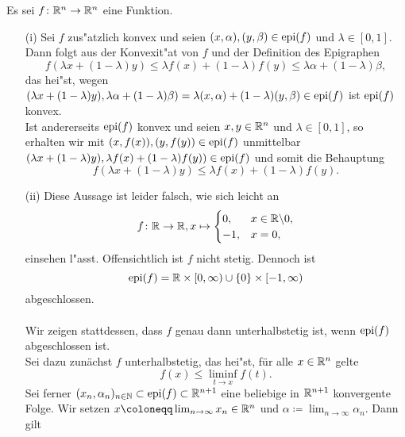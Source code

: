
Es sei $f\colon\mathbb{R}^n\to\mathbb{R}^n$ eine Funktion.

\begin{itemize}
 \item[(i)] Sei $f$ zus"atzlich konvex und seien $(x,\alpha),(y,\beta)\in\operatorname{epi}(f)$ und $\lambda\in[0,1]$.
 Dann folgt aus der Konvexit"at von $f$ und der Definition des Epigraphen
 \begin{displaymath}
  f(\lambda x+(1-\lambda)y)\leq \lambda f(x)+(1-\lambda)f(y)\leq \lambda\alpha+(1-\lambda)\beta,
 \end{displaymath}
 das hei"st, wegen $(\lambda x+(1-\lambda)y),\lambda\alpha+(1-\lambda)\beta)=\lambda(x,\alpha)+(1-\lambda)(y,\beta)\in\operatorname{epi}(f)$
 ist $\operatorname{epi}(f)$ konvex.\\
 Ist andererseits $\operatorname{epi}(f)$ konvex und seien $x,y\in\mathbb{R}^n$ und $\lambda\in[0,1]$, so erhalten wir mit
 $(x,f(x)),(y,f(y))\in\operatorname{epi}(f)$ unmittelbar $(\lambda x+(1-\lambda)y),\lambda f(x)+(1-\lambda)f(y))\in \operatorname{epi}(f)$ und somit die Behauptung
 \begin{displaymath}
  f(\lambda x+(1-\lambda)y)\leq\lambda f(x)+(1-\lambda)f(y).
 \end{displaymath}
 \item[(ii)] Diese Aussage ist leider falsch, wie sich leicht an 
 \begin{displaymath}
  f\colon\mathbb{R}\to\mathbb{R}, x\mapsto \begin{cases}
                       0, &x\in\mathbb{R}\backslash{0},\\
                       -1, &x=0,
                      \end{cases}
 \end{displaymath}
 einsehen l"asst. Offensichtlich ist $f$ nicht stetig. Dennoch ist 
 \begin{displaymath}
  \operatorname{epi}(f)=\mathbb{R}\times[0,\infty)\cup\{0\}\times[-1,\infty)
 \end{displaymath}
 abgeschlossen.
 \\ \\
 Wir zeigen stattdessen, dass $f$ genau dann unterhalbstetig ist, wenn $\operatorname{epi}(f)$ abgeschlossen ist.\\
 Sei dazu zunächst $f$ unterhalbstetig, das hei"st, für alle $x\in\mathbb{R}^n$ gelte 
 \begin{displaymath}
  f(x)\leq\liminf_{t\to x}f(t).
 \end{displaymath}
 Sei ferner $(x_n,\alpha_n)_{n\in\mathbb{N}}\subset\operatorname{epi}(f)\subset\mathbb{R}^{n+1}$ eine beliebige in $\mathbb{R}^{n+1}$ konvergente Folge.
 Wir setzen $x\coloneqq \lim_{n\to\infty} x_n\in\Rn$ und $\alpha\coloneqq\lim_{n\to\infty}\alpha_n$. Dann gilt

\end{itemize}
